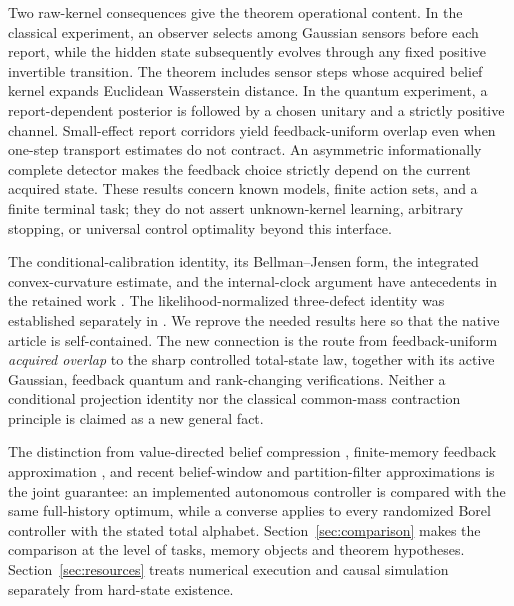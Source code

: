 Two raw-kernel consequences give the theorem operational content. In the classical experiment, an observer selects among Gaussian sensors before each report, while the hidden state subsequently evolves through any fixed positive invertible transition. The theorem includes sensor steps whose acquired belief kernel expands Euclidean Wasserstein distance. In the quantum experiment, a report-dependent posterior is followed by a chosen unitary and a strictly positive channel. Small-effect report corridors yield feedback-uniform overlap even when one-step transport estimates do not contract. An asymmetric informationally complete detector makes the feedback choice strictly depend on the current acquired state. These results concern known models, finite action sets, and a finite terminal task; they do not assert unknown-kernel learning, arbitrary stopping, or universal control optimality beyond this interface.

The conditional-calibration identity, its Bellman--Jensen form, the integrated convex-curvature estimate, and the internal-clock argument have antecedents in the retained work \cite{GTFControl,GTFAllocation}. The likelihood-normalized three-defect identity was established separately in \cite{GTFBayes}. We reprove the needed results here so that the native article is self-contained. The new connection is the route from feedback-uniform \emph{acquired overlap} to the sharp controlled total-state law, together with its active Gaussian, feedback quantum and rank-changing verifications. Neither a conditional projection identity nor the classical common-mass contraction principle is claimed as a new general fact.

The distinction from value-directed belief compression \cite{PB2000,PB2001,PB2002}, finite-memory feedback approximation \cite{KY2022}, and recent belief-window and partition-filter approximations \cite{Kim2026,DGM2026} is the joint guarantee: an implemented autonomous controller is compared with the same full-history optimum, while a converse applies to every randomized Borel controller with the stated total alphabet. Section~\ref{sec:comparison} makes the comparison at the level of tasks, memory objects and theorem hypotheses. Section~\ref{sec:resources} treats numerical execution and causal simulation separately from hard-state existence.
